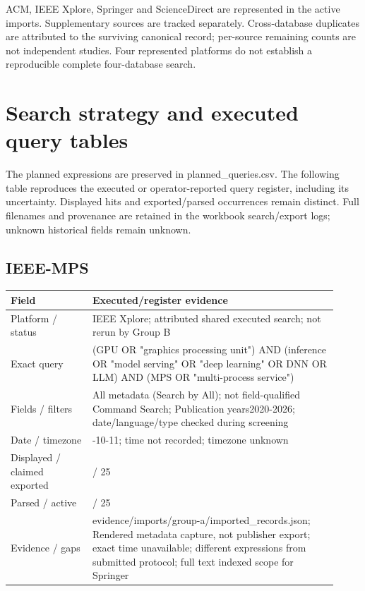 \documentclass[12pt,a4paper]{article}
\begin{document}
ACM, IEEE Xplore, Springer and ScienceDirect are represented in the active imports. Supplementary sources are tracked separately. Cross-database duplicates are attributed to the surviving canonical record; per-source remaining counts are not independent studies. Four represented platforms do not establish a reproducible complete four-database search.



\section{Search strategy and executed query tables}

The planned expressions are preserved in planned\_\allowbreak{}queries.csv. The following table reproduces the executed or operator-reported query register, including its uncertainty. Displayed hits and exported/\allowbreak{}parsed occurrences remain distinct. Full filenames and provenance are retained in the workbook search/\allowbreak{}export logs; unknown historical fields remain unknown.


\subsection*{IEEE-MPS}

{\small\begin{longtable}{>{\raggedright\arraybackslash}p{0.23\linewidth}>{\raggedright\arraybackslash}p{0.69\linewidth}}
\toprule
Field & Executed/\allowbreak{}register evidence\\\midrule
\endhead
Platform /\allowbreak{} status & IEEE Xplore; attributed shared executed search; not rerun by Group B\\
Exact query & (GPU OR "graphics processing unit") AND (inference OR "model serving" OR "deep learning" OR DNN OR LLM) AND (MPS OR "multi-process service")\\
Fields /\allowbreak{} filters & All metadata (Search by All); not field-qualified Command Search; Publication years2020-2026; date/\allowbreak{}language/\allowbreak{}type checked during screening\\
Date /\allowbreak{} timezone & 2026-10-11; time not recorded; timezone unknown\\
Displayed /\allowbreak{} claimed exported & 25 /\allowbreak{} 25\\
Parsed /\allowbreak{} active & 25 /\allowbreak{} 25\\
Evidence /\allowbreak{} gaps & evidence/\allowbreak{}imports/\allowbreak{}group-a/\allowbreak{}imported\_\allowbreak{}records.json; Rendered metadata capture, not publisher export; exact time unavailable; different expressions from submitted protocol; full text indexed scope for Springer\\
\bottomrule
\end{longtable}}
\end{document}
